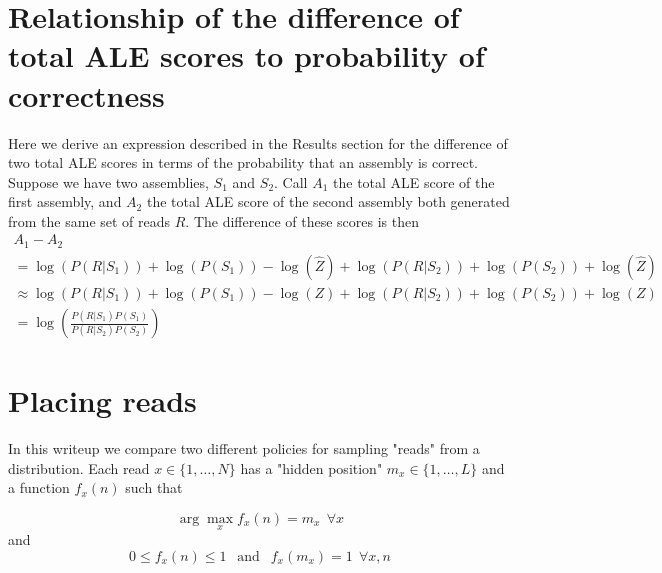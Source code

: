 \documentclass[phd,tocprelim]{cornell}
\begin{document}
\section{Relationship of the difference of total ALE scores to probability of correctness} %
\label{sec:Relationship of the difference of total ALE scores to probability of correctness}

Here we derive an expression described in the Results section for the difference of two total ALE scores in terms of the probability that an assembly is correct.  Suppose we have two assemblies, $S_{1}$ and $S_{2}$.  Call $A_{1}$ the total ALE score of the first assembly, and $A_{2}$ the total ALE score of the second assembly both generated from the same set of reads $R$. The difference of these scores is then
\begin{equation}
    \begin{array}{l}
        A_{1} - A_{2} \\
        = \log\left(P\left(R|S_{1}\right)\right) + \log\left(P\left(S_{1}\right)\right) - \log\left(\hat{Z}\right) + \log\left(P\left(R|S_{2}\right)\right) + \log\left(P\left(S_{2}\right)\right) + \log\left(\hat{Z}\right) \\
        \approx \log\left(P\left(R|S_{1}\right)\right) + \log\left(P\left(S_{1}\right)\right) - \log\left(Z\right) + \log\left(P\left(R|S_{2}\right)\right) + \log\left(P\left(S_{2}\right)\right) + \log\left(Z\right) \\
        = \log\left(\frac{P\left(R|S_{1}\right)P\left(S_{1}\right)}{P\left(R|S_{2}\right)P\left(S_{2}\right)}\right)
    \end{array}
\end{equation}


\section{Placing reads} %
\label{sec:Placing reads}

In this writeup we compare two different policies for sampling "reads" from a distribution. Each read $x \in \{1, \ldots, N\}$ has a "hidden position" $m_{x} \in \{1, \ldots, L\}$ and a function $f_{x}(n)$ such that

\[\arg\max_{x} f_{x}(n) = m_{x} \ \ \forall x\]
and
\[0 \leq f_{x}(n) \leq 1 \ \ \mbox{ and } \ \ f_{x}(m_{x}) = 1 \ \ \forall x,n\]
\end{document}
